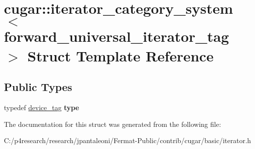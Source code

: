 \hypertarget{structcugar_1_1iterator__category__system_3_01forward__universal__iterator__tag_01_4}{}\section{cugar\+:\+:iterator\+\_\+category\+\_\+system$<$ forward\+\_\+universal\+\_\+iterator\+\_\+tag $>$ Struct Template Reference}
\label{structcugar_1_1iterator__category__system_3_01forward__universal__iterator__tag_01_4}
\subsection*{Public Types}
\begin{DoxyCompactItemize}
\item 
\mbox{\label{structcugar_1_1iterator__category__system_3_01forward__universal__iterator__tag_01_4_a6f2b0686374aa77d5cd3ad0fccaf756c}} 
typedef \hyperlink{structcugar_1_1device__tag}{device\+\_\+tag} {\bfseries type}
\end{DoxyCompactItemize}


The documentation for this struct was generated from the following file\+:\begin{DoxyCompactItemize}
\item 
C\+:/p4research/research/jpantaleoni/\+Fermat-\/\+Public/contrib/cugar/basic/iterator.\+h\end{DoxyCompactItemize}
